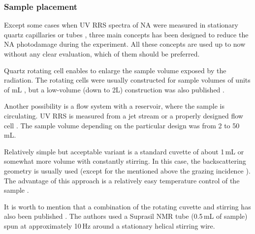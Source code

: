 \subsubsection{Sample placement}

Except some cases when UV RRS spectra of NA were measured in stationary quartz
capillaries or tubes
\parencite{%
	Blazej1977,%
	Asher1983%
},
three main concepts has been designed to reduce the NA photodamage during the
experiment.
All these concepts are used up to now without any clear evaluation, which of
them should be preferred.

Quartz rotating cell enables to enlarge the sample volume exposed by the
radiation.
The rotating cells were usually constructed for sample volumes of units of mL
\parencite{%
	Kiefer1971,%
	Kiefer1971a,%
	Pezolet1973,%
	Nishimura1977,%
	Laigle1982a,%
	Asher1983,%
	Benson1992,%
	Toyama1993,%
	Russell1995%
},
but a low-volume (down to 2L) construction was also published
\parencite{Gfrorer1993a}.

Another possibility is a flow system with a reservoir, where the sample is
circulating.
UV RRS is measured from a jet stream
\parencite{%
	Ziegler1981,%
	Asher1983,%
	Fodor1985,%
	Russell1995,%
	Toyama1993%
}
or a properly designed flow cell
\parencite{%
	Blazej1980,%
	Gfrorer1989%
}.
The sample volume depending on the particular design was from 2 to 50\,mL.

Relatively simple but acceptable variant is a standard cuvette of about 1\,mL
or somewhat more volume with constantly stirring.
In this case, the backscattering geometry is usually used (except for the
mentioned above the grazing incidence
\parencite{Jolles1984}).
The advantage of this approach is a relatively easy temperature control of the
sample
\parencite{Mukerji1995}.

It is worth to mention that a combination of the rotating cuvette and stirring
has also been published
\parencite{Rodgers1992}.
The authors used a Suprasil NMR tube (0.5\,mL of sample) spun at approximately
10\,Hz around a stationary helical stirring wire.
